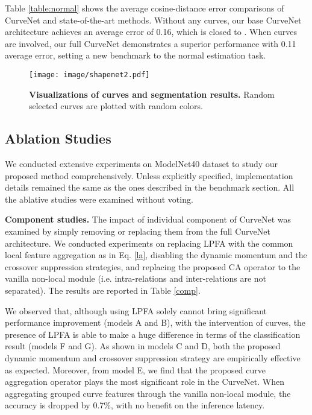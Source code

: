 \documentclass[10pt,twocolumn,letterpaper]{article}
\theoremstyle{definition}
\begin{document}
Table \ref{table:normal} shows the average cosine-distance error comparisons of CurveNet and state-of-the-art methods. Without any curves, our base CurveNet architecture achieves an average error of 0.16, which is closed to \cite{liu2019relation, guo2020pct}. When curves are involved, our full CurveNet demonstrates a superior performance with 0.11 average error, setting a new benchmark to the normal estimation task.



\begin{figure}[t]
	\begin{center}
\texttt{[image: image/shapenet2.pdf]}
	\end{center}
	\caption{\textbf{Visualizations of curves and segmentation results.} Random selected curves are plotted with random colors.}
	\label{fig:shapenet}
\end{figure}

\subsection{Ablation Studies}

We conducted extensive experiments on ModelNet40 dataset to study our proposed method comprehensively. Unless explicitly specified, implementation details remained the same as the ones described in the benchmark section. All the ablative studies were examined without voting.


\noindent
\textbf{Component studies.} The impact of individual component of CurveNet was examined by simply removing or replacing them from the full CurveNet architecture. We conducted experiments on replacing LPFA with the common local feature aggregation as in Eq. \ref{la}, disabling the dynamic momentum and the crossover suppression strategies, and replacing the proposed CA operator to the vanilla non-local module (i.e. intra-relations and inter-relations are not separated). The results are reported in Table \ref{comp}. 

We observed that, although using LPFA solely cannot bring significant performance improvement (models A and B), with the intervention of curves, the presence of LPFA is able to make a huge difference in terms of the classification result (models F and G). As shown in models C and D, both the proposed dynamic momentum and crossover suppression strategy are empirically effective as expected. Moreover, from model E, we find that the proposed curve aggregation operator plays the most significant role in the CurveNet. When aggregating grouped curve features through the vanilla non-local module, the accuracy is dropped by 0.7\%, with no benefit on the inference latency.  
\end{document}
